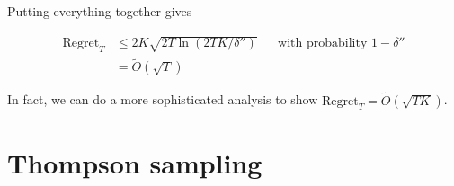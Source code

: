\documentclass[\main/main]{subfiles}
\begin{document}
Putting everything together gives

\begin{align*}
    \text{Regret}_T &\le 2 K \sqrt{2T \ln(2TK/\delta'')} && \text{with probability } 1-\delta'' \\
    &= \tilde O(\sqrt{T})
\end{align*}


In fact, we can do a more sophisticated analysis to show $\text{Regret}_T = \tilde O(\sqrt{TK})$. 


\section{Thompson sampling}
\end{document}
